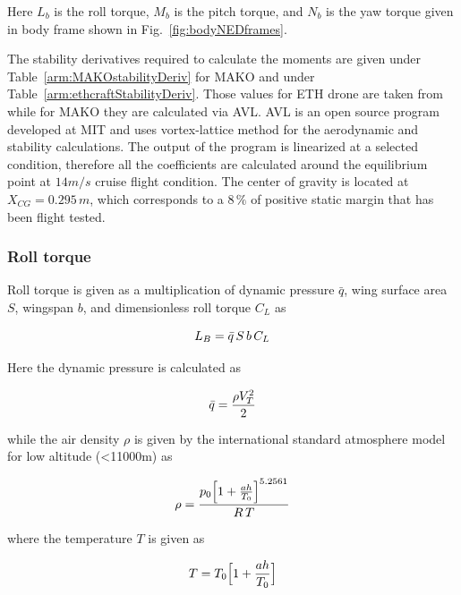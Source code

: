 Here $L_b$ is the roll torque, $M_b$ is the pitch torque, and $N_b$ is the yaw torque given in body frame shown in Fig.~\ref{fig:bodyNEDframes}.

The stability derivatives required to calculate the moments are given under Table~\ref{arm:MAKOstabilityDeriv} for MAKO and under Table~\ref{arm:ethcraftStabilityDeriv}. 
Those values for ETH drone are taken from \cite{ducard2009fault} while for MAKO they are calculated via AVL. 
AVL is an open source program developed at MIT and uses vortex-lattice method for the aerodynamic and stability calculations.
The output of the program is linearized at a selected condition, therefore all the coefficients are calculated around the equilibrium point at $14m/s$ cruise flight condition.
The center of gravity is located at $X_{CG}= 0.295\,m$, which corresponds to a $8\,\%$ of positive static margin that has been flight tested. %

\subsubsection{Roll torque}

Roll torque is given as a multiplication of dynamic pressure $\bar{q}$, wing surface area $S$, wingspan $b$,  and dimensionless roll torque $C_L$ as 

\begin{equation}{\label{eqn:rollTorque}}
L_B = \bar{q} \, S \, b \, C_L
\end{equation}

Here the dynamic pressure is calculated as 

\begin{equation}{\label{eqn:dynamicPressure}}
\bar{q}=\frac{\rho V_T^2}{2} 
\end{equation}

while the air density $\rho$ is given by the international standard atmosphere model for low altitude (<11000m) as 

\begin{equation}{\label{eqn:airDensityStandard}}
\rho = \frac{p_0 \Big[ 1+\frac{ah}{T_0} \Big]^{5.2561}}{R\,T}
\end{equation}

where the temperature $T$ is given as

\begin{equation}{\label{eqn:temperature}}
T=T_0\Big[ 1 + \frac{ah}{T_0} \Big]
\end{equation}

